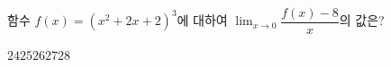 함수 $f(x)=(x^2+2x+2)^3$에 대하여 $\displaystyle\lim_{x\to 0}\dfrac{f(x)-8}{x}$의 값은?
\begin{choices32}{$24$}{$25$}{$26$}{$27$}{$28$}\end{choices32}
